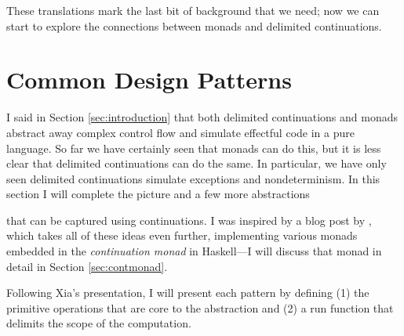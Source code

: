 \documentclass[acmsmall, nonacm, screen]{acmart}
\newif\ifdraft\drafttrue
\newcommand{\outline}[1]{
  \ifdraft
  {\color{red}{#1}}
  \fi
}
\newcommand{\lambdaE}[2]{\lambda #1.\, #2}
\begin{document}

\outline{redo} These translations mark the last bit of background that we need; now we can start to explore the
connections between monads and delimited continuations.

\section{Common Design Patterns} \label{sec:patterns}
I said in Section \ref{sec:introduction} that both delimited continuations and monads abstract
away complex control flow and simulate effectful code in a pure language. So far we have
certainly seen that monads can do this, but it is less clear that delimited continuations can do
the same. In particular, we have only seen delimited continuations simulate exceptions and
nondeterminism. In this section I will complete the picture and a few more abstractions \outline{ew} that can
be captured using continuations. I was inspired by a blog post by \citet{xia_2019}, which takes
all of these ideas even further, implementing various monads embedded in the {\em continuation
monad} in Haskell---I will discuss that monad in detail in Section \ref{sec:contmonad}.

Following Xia's presentation, I will present each pattern by defining (1) the primitive
operations that are core to the abstraction and (2) a \textsf{run} function that delimits the
scope of the computation.
\end{document}
